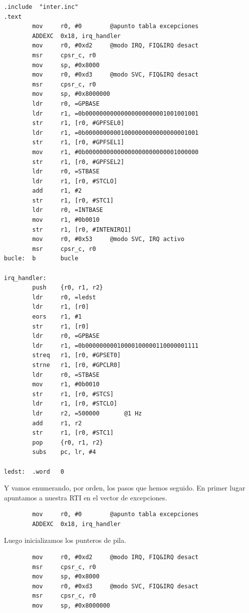 \begin{lstlisting}[caption={inter2.c},label={lst:codigoPract5_2}]
        .include  "inter.inc"
.text
        mov     r0, #0        @apunto tabla excepciones
        ADDEXC  0x18, irq_handler
        mov     r0, #0xd2     @modo IRQ, FIQ&IRQ desact
        msr     cpsr_c, r0
        mov     sp, #0x8000
        mov     r0, #0xd3     @modo SVC, FIQ&IRQ desact
        msr     cpsr_c, r0
        mov     sp, #0x8000000
        ldr     r0, =GPBASE
        ldr     r1, =0b00000000000000000000001001001001
        str     r1, [r0, #GPFSEL0]
        ldr     r1, =0b00000000001000000000000000001001
        str     r1, [r0, #GPFSEL1]
        mov     r1, #0b00000000000000000000000001000000
        str     r1, [r0, #GPFSEL2]
        ldr     r0, =STBASE
        ldr     r1, [r0, #STCLO]
        add     r1, #2
        str     r1, [r0, #STC1]
        ldr     r0, =INTBASE
        mov     r1, #0b0010
        str     r1, [r0, #INTENIRQ1]
        mov     r0, #0x53     @modo SVC, IRQ activo
        msr     cpsr_c, r0
bucle:  b       bucle

irq_handler:
        push    {r0, r1, r2}
        ldr     r0, =ledst
        ldr     r1, [r0]
        eors    r1, #1
        str     r1, [r0]
        ldr     r0, =GPBASE
        ldr     r1, =0b00000000010000100000110000001111
        streq   r1, [r0, #GPSET0]
        strne   r1, [r0, #GPCLR0]
        ldr     r0, =STBASE
        mov     r1, #0b0010
        str     r1, [r0, #STCS]
        ldr     r1, [r0, #STCLO]
        ldr     r2, =500000       @1 Hz
        add     r1, r2
        str     r1, [r0, #STC1]
        pop     {r0, r1, r2}
        subs    pc, lr, #4

ledst:  .word   0
\end{lstlisting}

Y vamos enumerando, por orden, los pasos que hemos seguido. En primer lugar apuntamos a nuestra
RTI en el vector de excepciones.

\begin{lstlisting}
        mov     r0, #0        @apunto tabla excepciones
        ADDEXC  0x18, irq_handler
\end{lstlisting}

Luego inicializamos los punteros de pila.

\begin{lstlisting}
        mov     r0, #0xd2     @modo IRQ, FIQ&IRQ desact
        msr     cpsr_c, r0
        mov     sp, #0x8000
        mov     r0, #0xd3     @modo SVC, FIQ&IRQ desact
        msr     cpsr_c, r0
        mov     sp, #0x8000000
\end{lstlisting}


